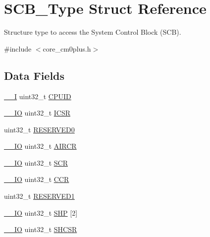 \hypertarget{struct_s_c_b___type}{}\section{S\+C\+B\+\_\+\+Type Struct Reference}
\label{struct_s_c_b___type}


Structure type to access the System Control Block (S\+CB).  




{\ttfamily \#include $<$core\+\_\+cm0plus.\+h$>$}

\subsection*{Data Fields}
\begin{DoxyCompactItemize}
\item 
\mbox{\hyperlink{core__cm0plus_8h_af63697ed9952cc71e1225efe205f6cd3}{\+\_\+\+\_\+I}} uint32\+\_\+t \mbox{\hyperlink{struct_s_c_b___type_a30abfea43143a424074f682bd61eace0}{C\+P\+U\+ID}}
\item 
\mbox{\hyperlink{core__cm0plus_8h_aec43007d9998a0a0e01faede4133d6be}{\+\_\+\+\_\+\+IO}} uint32\+\_\+t \mbox{\hyperlink{struct_s_c_b___type_a8fec9e122b923822e7f951cd48cf1d47}{I\+C\+SR}}
\item 
uint32\+\_\+t \mbox{\hyperlink{struct_s_c_b___type_af86c61a5d38a4fc9cef942a12744486b}{R\+E\+S\+E\+R\+V\+E\+D0}}
\item 
\mbox{\hyperlink{core__cm0plus_8h_aec43007d9998a0a0e01faede4133d6be}{\+\_\+\+\_\+\+IO}} uint32\+\_\+t \mbox{\hyperlink{struct_s_c_b___type_aaec159b48828355cb770049b8b2e8d91}{A\+I\+R\+CR}}
\item 
\mbox{\hyperlink{core__cm0plus_8h_aec43007d9998a0a0e01faede4133d6be}{\+\_\+\+\_\+\+IO}} uint32\+\_\+t \mbox{\hyperlink{struct_s_c_b___type_a64a95891ad3e904dd5548112539c1c98}{S\+CR}}
\item 
\mbox{\hyperlink{core__cm0plus_8h_aec43007d9998a0a0e01faede4133d6be}{\+\_\+\+\_\+\+IO}} uint32\+\_\+t \mbox{\hyperlink{struct_s_c_b___type_a5e1322e27c40bf91d172f9673f205c97}{C\+CR}}
\item 
uint32\+\_\+t \mbox{\hyperlink{struct_s_c_b___type_ac4ac04e673b5b8320d53f7b0947db902}{R\+E\+S\+E\+R\+V\+E\+D1}}
\item 
\mbox{\hyperlink{core__cm0plus_8h_aec43007d9998a0a0e01faede4133d6be}{\+\_\+\+\_\+\+IO}} uint32\+\_\+t \mbox{\hyperlink{struct_s_c_b___type_a70aade06546bce9391e17d9b44beb3a7}{S\+HP}} \mbox{[}2\mbox{]}
\item 
\mbox{\hyperlink{core__cm0plus_8h_aec43007d9998a0a0e01faede4133d6be}{\+\_\+\+\_\+\+IO}} uint32\+\_\+t \mbox{\hyperlink{struct_s_c_b___type_a04d136e5436e5fa2fb2aaa78a5f86b19}{S\+H\+C\+SR}}
\end{DoxyCompactItemize}



